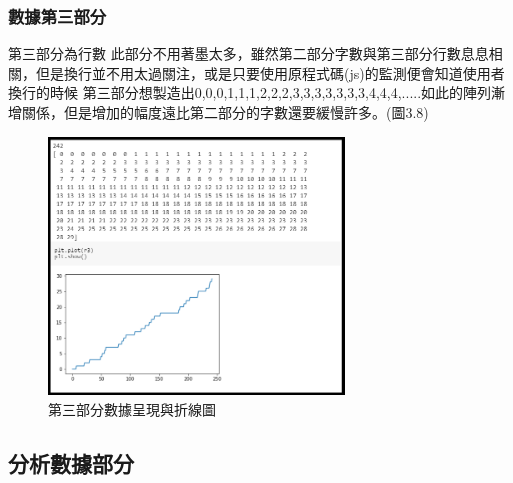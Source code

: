 \subsubsection{數據第三部分}
第三部分為行數 此部分不用著墨太多，雖然第二部分字數與第三部分行數息息相關，但是換行並不用太過關注，或是只要使用原程式碼(js)的監測便會知道使用者換行的時候
第三部分想製造出0,0,0,1,1,1,2,2,2,3,3,3,3,3,3,3,4,4,4,.....如此的陣列漸增關係，但是增加的幅度遠比第二部分的字數還要緩慢許多。(圖3.8)
	\begin{figure}[H] %
	\centering %
	\includegraphics[width=0.7\textwidth]{3_2_1_5.png} %
	\caption{第三部分數據呈現與折線圖} %
	\label{Fig.3.8} %
	\end{figure}
\subsection{分析數據部分}
